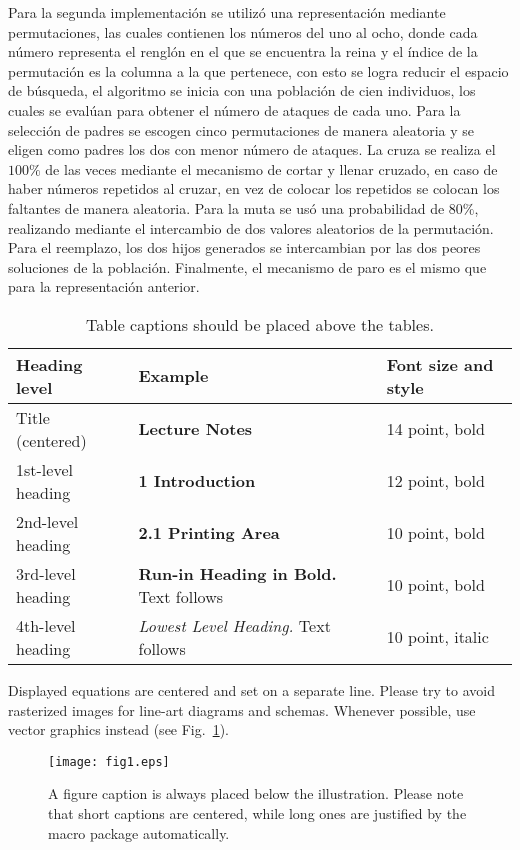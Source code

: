 \documentclass[runningheads]{llncs}
\begin{document}
Para la segunda implementación se utilizó una representación mediante permutaciones, las cuales contienen los números del uno al ocho, donde cada número representa el renglón en el que se encuentra la reina y el índice de la permutación es la columna a la que pertenece, con esto se logra reducir el espacio de búsqueda, el algoritmo se inicia con una población de cien individuos, los cuales se evalúan para obtener el número de ataques de cada uno. Para la selección de padres se escogen cinco permutaciones de manera aleatoria y se eligen como padres los dos con menor número de ataques. La cruza se realiza el $100\%$ de las veces mediante el mecanismo de cortar y llenar cruzado, en caso de haber números repetidos al cruzar, en vez de colocar los repetidos se colocan los faltantes de manera aleatoria. Para la muta se usó una probabilidad de $80\%$, realizando mediante el intercambio de dos valores aleatorios de la permutación. Para el reemplazo, los dos hijos generados se intercambian por las dos peores soluciones de la población. Finalmente, el mecanismo de paro es el mismo que para la representación anterior.

\begin{table}
\caption{Table captions should be placed above the
tables.}\label{tab1}
\begin{tabular}{|l|l|l|}
\hline
Heading level &  Example & Font size and style\\
\hline
Title (centered) &  {\Large\bfseries Lecture Notes} & 14 point, bold\\
1st-level heading &  {\large\bfseries 1 Introduction} & 12 point, bold\\
2nd-level heading & {\bfseries 2.1 Printing Area} & 10 point, bold\\
3rd-level heading & {\bfseries Run-in Heading in Bold.} Text follows & 10 point, bold\\
4th-level heading & {\itshape Lowest Level Heading.} Text follows & 10 point, italic\\
\hline
\end{tabular}
\end{table}


\noindent Displayed equations are centered and set on a separate
line.
Please try to avoid rasterized images for line-art diagrams and
schemas. Whenever possible, use vector graphics instead (see
Fig.~\ref{fig1}).

\begin{figure}
\texttt{[image: fig1.eps]}
\caption{A figure caption is always placed below the illustration.
Please note that short captions are centered, while long ones are
justified by the macro package automatically.} \label{fig1}
\end{figure}
\end{document}
